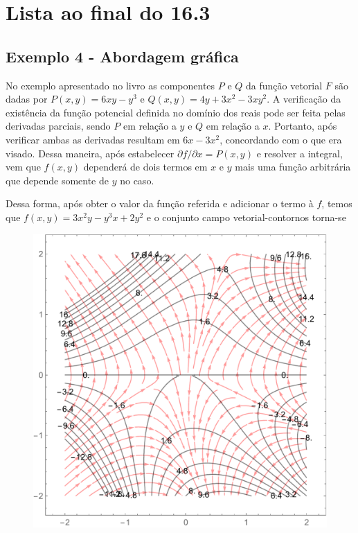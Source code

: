 \documentclass[a4paper, 12pt, brazilian]{article}
\begin{document}
	\section{Lista ao final do 16.3}
	
	\subsection{Exemplo 4 - Abordagem gráfica}
	
	No exemplo apresentado no livro as componentes $P$ e $Q$ da função vetorial $F$ são dadas por $P(x,y)=6xy-y^{3}$ e $Q(x,y)=4y+3x^{2}-3xy^{2}$. A verificação da existência da função potencial definida no domínio dos reais pode ser feita pelas derivadas parciais, sendo $P$ em relação a $y$ e $Q$ em relação a $x$. Portanto, após verificar ambas as derivadas resultam em $6x-3x^{2}$, concordando com o que era visado. Dessa maneira, após estabelecer $\partial f/\partial x=P(x,y)$ e resolver a integral, vem que $f(x,y)$ dependerá de dois termos em $x$ e $y$ mais uma função arbitrária que depende somente de $y$ no caso. 
	
	Dessa forma, após obter o valor da função referida e adicionar o termo à $f$, temos que $f(x,y)=3x^{2}y-y^{3}x+2y^{2}$ e o conjunto campo vetorial-contornos torna-se
	\begin{figure}[H]
		\centering
		\includegraphics[width=0.7\linewidth]{images/ex4}
		\label{fig:ex4}
	\end{figure}
	
\end{document}
